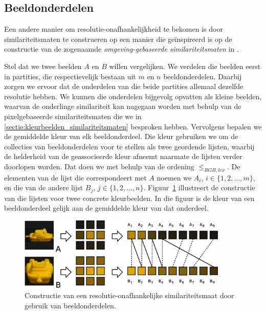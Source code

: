 \subsection{Beeldonderdelen}

Een andere manier om resolutie-onafhankelijkheid te bekomen is door similariteitsmaten te construeren 
op een manier die ge\"inspireerd is op de constructie van de zogenaamde \emph{omgeving-gebaseerde 
similariteitsmaten} in \cite{vanderweken:similariteitsmaten}. 

Stel dat we twee beelden $A$ en $B$ willen
vergelijken. We verdelen
die beelden eerst in partities, die respectievelijk bestaan uit
$m$ en $n$ beeldonderdelen. Daarbij zorgen we ervoor dat de onderdelen
van die beide partities allemaal dezelfde resolutie hebben. We kunnen die onderdelen bijgevolg 
opvatten als kleine beelden, waarvan de onderlinge similariteit kan nagegaan worden met behulp 
van de pixelgebaseerde similariteitsmaten die we in \ref{sectie:kleurbeelden_similariteitsmaten}
besproken hebben.
Vervolgens bepalen we de gemiddelde kleur van elk beeldonderdeel. Die kleur gebruiken we om
de collecties van beeldonderdelen voor te stellen als twee geordende lijsten, waarbij de 
helderheid van de geassocieerde kleur afneemt naarmate de lijsten verder doorlopen worden.
Dat doen we met behulp van de ordening $\leq_{RGB,lex}$. 
De elementen van de lijst die correspondeert met $A$ noemen 
we $A_i$, $i \in \{1,2,\ldots,m\}$, en die van de andere lijst $B_j$, $j \in \{1,2,\ldots,n\}$.
Figuur~\ref{fig:multires} illustreert de constructie van die lijsten voor twee concrete
kleurbeelden. In die figuur is de kleur van een beeldonderdeel gelijk aan de gemiddelde 
kleur van dat onderdeel.

\begin{figure}[bp]
\vspace{10pt}
\centering
\includegraphics[width=10cm]{images/multires.eps}
\caption{\label{fig:multires}Constructie van een resolutie-onafhankelijke similariteitsmaat 
door gebruik van beeldonderdelen.}
\end{figure}

